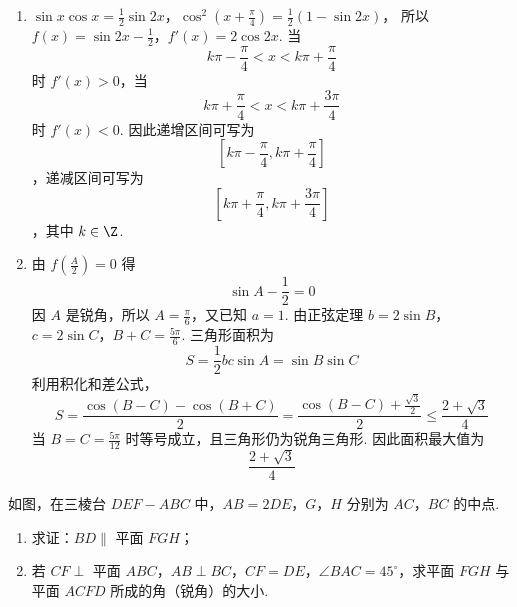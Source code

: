 \begin{solution}
\begin{enumerate}
\item
\(\sin x\cos x=\frac12\sin2x\)，\(\cos^2\left(x+\frac\pi4\right)=\frac12(1-\sin2x)\)，
所以
\(f(x)=\sin2x-\frac12\)，\(f'(x)=2\cos2x\).
当
\[
k\pi-\frac\pi4<x<k\pi+\frac\pi4
\]
时 \(f'(x)>0\)，当
\[
k\pi+\frac\pi4<x<k\pi+\frac{3\pi}4
\]
时 \(f'(x)<0\). 因此递增区间可写为
\[
\left[k\pi-\frac\pi4,k\pi+\frac\pi4\right]
\]
，递减区间可写为
\[
\left[k\pi+\frac\pi4,k\pi+\frac{3\pi}4\right]
\]
，其中 \(k\in\Z\).
\item 由 \(f\left(\frac A2\right)=0\) 得
\[
\sin A-\frac12=0
\]
因 \(A\) 是锐角，所以 \(A=\frac\pi6\)，又已知 \(a=1\). 由正弦定理
\(b=2\sin B\)，\(c=2\sin C\)，\(B+C=\frac{5\pi}{6}\).
三角形面积为
\[
S=\frac12bc\sin A=\sin B\sin C
\]
利用积化和差公式，
\[
S=\frac{\cos(B-C)-\cos(B+C)}2
=\frac{\cos(B-C)+\frac{\sqrt3}{2}}2
\leqslant\frac{2+\sqrt3}{4}
\]
当 \(B=C=\frac{5\pi}{12}\) 时等号成立，且三角形仍为锐角三角形. 因此面积最大值为
\[
\frac{2+\sqrt3}{4}
\]
\end{enumerate}
\end{solution}

\begin{problem}
如图，在三棱台 \(DEF - ABC\) 中，\(AB = 2DE\)，\(G\)，\(H\) 分别为 \(AC\)，\(BC\) 的中点.
\begin{enumerate}
\item 求证：\(BD \parallel\) 平面 \(FGH\)；
\item 若 \(CF \perp\) 平面 \(ABC\)，\(AB \perp BC\)，\(CF = DE\)，\(\angle BAC = 45^{\circ}\)，求平面 \(FGH\) 与平面 \(ACFD\) 所成的角（锐角）的大小.
\end{enumerate}

\end{problem}

